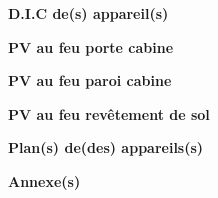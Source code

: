\documentclass[a4paper, oneside, 10pt, french]{article}
\begin{document}
\newpage

\vspace*{10cm}

\begin{center}
\textbf{\Huge D.I.C de(s) appareil(s)}
\end{center}

\newpage

\vspace*{10cm}

\begin{center}
\textbf{\Huge PV au feu porte cabine}
\end{center}

\newpage

\vspace*{10cm}

\begin{center}
\textbf{\Huge PV au feu paroi cabine}
\end{center}

\newpage

\vspace*{10cm}

\begin{center}
\textbf{\Huge PV au feu revêtement de sol}
\end{center}

\newpage

\vspace*{10cm}

\begin{center}
\textbf{\Huge Plan(s) de(des) appareils(s)}
\end{center}

\newpage

\vspace*{10cm}

\begin{center}
\textbf{\Huge Annexe(s)}
\end{center}
\end{document}
